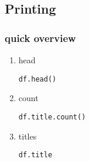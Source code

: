 \documentclass[11pt]{article}
\begin{document}
\subsection{Printing}
\label{sec:org583de4c}
\subsubsection{quick overview}
\label{sec:org6941a7a}
\begin{enumerate}
\item head
\label{sec:org3ff91e6}
\begin{verbatim}
df.head()
\end{verbatim}

\item count
\label{sec:orgade2ad0}
\begin{verbatim}
df.title.count()
\end{verbatim}
\item titles
\label{sec:org846be09}
\begin{verbatim}
df.title
\end{verbatim}
\end{enumerate}
\end{document}

